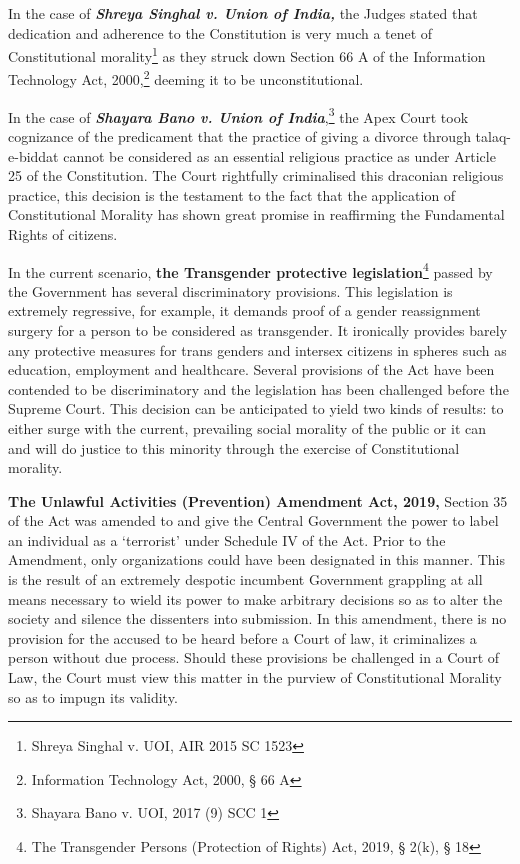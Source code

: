 \begin{multicols}{2}
\noi
In the case of \textbf{\textit{Shreya Singhal v. Union of India,}} the Judges stated that dedication and
adherence to the Constitution is very much a tenet of Constitutional morality\footnote{Shreya Singhal v. UOI, AIR 2015 SC 1523} as they struck down Section 66 A of the Information Technology Act, 2000,\footnote{Information Technology Act, 2000, § 66 A} deeming it to be
unconstitutional.

\noi
In the case of \textbf{\textit{Shayara Bano v. Union of India}},\footnote{Shayara Bano v. UOI, 2017 (9) SCC 1} the Apex Court took cognizance of the
predicament that the practice of giving a divorce through talaq-e-biddat cannot be considered
as an essential religious practice as under Article 25 of the Constitution. The Court rightfully
criminalised this draconian religious practice, this decision is the testament to the fact that the
application of Constitutional Morality has shown great promise in reaffirming the
Fundamental Rights of citizens.

\noi
In the current scenario, \textbf{the Transgender protective legislation}\footnote{The Transgender Persons (Protection of Rights) Act, 2019, § 2(k), § 18} passed by the Government
has several discriminatory provisions. This legislation is extremely regressive, for example, it
demands proof of a gender reassignment surgery for a person to be considered as transgender.
It ironically provides barely any protective measures for trans genders and intersex citizens in
spheres such as education, employment and healthcare. Several provisions of the Act have
been contended to be discriminatory and the legislation has been challenged before the
Supreme Court. This decision can be anticipated to yield two kinds of results: to either surge
with the current, prevailing social morality of the public or it can and will do justice to this
minority through the exercise of Constitutional morality.

\noi
\textbf{The Unlawful Activities (Prevention) Amendment Act, 2019,} Section 35 of the Act was
amended to and give the Central Government the power to label an individual as a ‘terrorist’
under Schedule IV of the Act. Prior to the Amendment, only organizations could have been
designated in this manner. This is the result of an extremely despotic incumbent Government
grappling at all means necessary to wield its power to make arbitrary decisions so as to alter
the society and silence the dissenters into submission. In this amendment, there is no
provision for the accused to be heard before a Court of law, it criminalizes a person without
due process. Should these provisions be challenged in a Court of Law, the Court must view
this matter in the purview of Constitutional Morality so as to impugn its validity.


\end{multicols}
